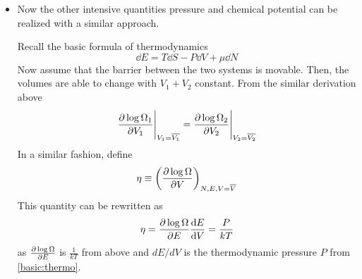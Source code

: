 \documentclass{article}
\begin{document}
\begin{itemize}
    \item Now the other intensive quantities pressure and chemical potential can be realized with a similar approach.

    \begin{derivation}
        Recall the basic formula of thermodynamics
        \begin{equation}
            \dd E=T\dd S-P\dd V+\mu\dd N \label{basic:thermo}
        \end{equation}
        Now assume that the barrier between the two systems is movable. Then, the volumes are able to change with $V_1+V_2$ constant. From the similar derivation above
        \begin{equation}
            \partialderivative{\log\Omega_1}{V_1}\Bigg|_{V_1=\overline{V_1}}=\partialderivative{\log\Omega_2}{V_2}\Bigg|_{V_2=\overline{V_2}}
        \end{equation}
        In a similar fashion, define
        \begin{equation}
            \eta\equiv\left(\partialderivative{\log\Omega}{V}\right)_{N,E,V=\overline{V}}
        \end{equation}
        This quantity can be rewritten as 
        \begin{equation}
            \eta=\partialderivative{\log\Omega}{E}\derivative{E}{V}=\frac{P}{kT}\label{13}
        \end{equation}
        as $\partialderivative{\log\Omega}{E}$ is $\frac{1}{kT}$ from above and $dE/dV$ is the thermodynamic pressure $P$ from \eqref{basic:thermo}.


\end{derivation}
\end{itemize}
\end{document}
